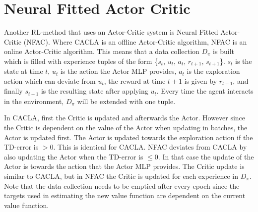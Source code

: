 
\section{Neural Fitted Actor Critic}
Another RL-method that uses an Actor-Critic system is Neural Fitted Actor-Critic (NFAC). Where CACLA is an offline Actor-Critic algorithm, NFAC is an online Actor-Critic algorithm. This means that a data collection $D_{\pi}$ is built which is filled with experience tuples of the form \{$s_{t}$, $u_{t}$, $a_{t}$, $r_{t+1}$, $s_{t+1}$\}. $s_{t}$ is the state at time $t$, $u_{t}$ is the action the Actor MLP provides, $a_{t}$ is the exploration action which can deviate from $u_{t}$, the reward at time $t+1$ is given by $r_{t+1}$, and finally $s_{t+1}$ is the resulting state after applying $u_{t}$. Every time the agent interacts in the environment, $D_{\pi}$ will be extended with one tuple.

In CACLA, first the Critic is updated and afterwards the Actor. However since the Critic is dependent on the value of the Actor when updating in batches, the Actor is updated first. The Actor is updated towards the exploration action if the TD-error is $> 0$. This is identical for CACLA. NFAC deviates from CACLA by also updating the Actor when the TD-error is $\leq 0$. In that case the update of the Actor is towards the action that the Actor MLP provides. The Critic update is similar to CACLA, but in NFAC the Critic is updated for each experience in $D_{\pi}$. Note that the data collection needs to be emptied after every epoch since the targets used in estimating the new value function are dependent on the current value function. 

